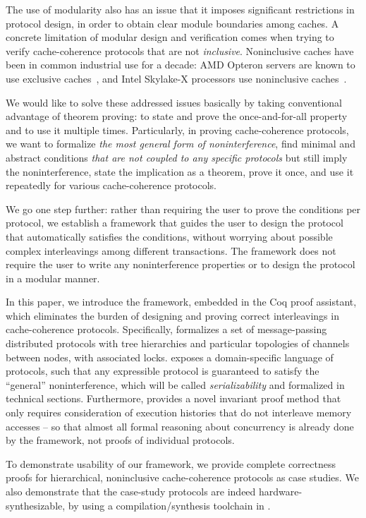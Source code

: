 \documentclass[sigplan,10pt,review,anonymous,screen]{acmart}\settopmatter{printfolios=true,printccs=false,printacmref=false}
\begin{document}
The use of modularity also has an issue that it imposes significant restrictions in protocol design, in order to obtain clear module boundaries among caches.
A concrete limitation of modular design and verification comes when trying to verify cache-coherence protocols that are not \emph{inclusive}.
Noninclusive caches have been in common industrial use for a decade: AMD Opteron servers are known to use exclusive caches~\cite{Irazoqui:2016}, and Intel Skylake-X processors use noninclusive caches~\cite{intel-non-inclusive,Zhao:2010,Yan:2019}.

We would like to solve these addressed issues basically by taking conventional advantage of theorem proving: to state and prove the once-and-for-all property and to use it multiple times.
Particularly, in proving cache-coherence protocols, we want to formalize \emph{the most general form of noninterference}, find minimal and abstract conditions \emph{that are not coupled to any specific protocols} but still imply the noninterference, state the implication as a theorem, prove it once, and use it repeatedly for various cache-coherence protocols.

We go one step further: rather than requiring the user to prove the conditions per protocol, we establish a framework that guides the user to design the protocol that automatically satisfies the conditions, without worrying about possible complex interleavings among different transactions.
The framework does not require the user to write any noninterference properties or to design the protocol in a modular manner.

In this paper, we introduce the \hemiola{} framework, embedded in the Coq proof assistant, which eliminates the burden of designing and proving correct interleavings in cache-coherence protocols.
Specifically, \hemiola{} formalizes a set of message-passing distributed protocols with tree hierarchies and particular topologies of channels between nodes, with associated locks.
\hemiola{} exposes a domain-specific language of protocols, such that any expressible protocol is guaranteed to satisfy the ``general'' noninterference, which will be called \emph{serializability} and formalized in technical sections.
Furthermore, \hemiola{} provides a novel invariant proof method that only requires consideration of execution histories that do not interleave memory accesses -- so that almost all formal reasoning about concurrency is already done by the framework, not proofs of individual protocols.

To demonstrate usability of our framework, we provide complete correctness proofs for hierarchical, noninclusive cache-coherence protocols as case studies.
We also demonstrate that the case-study protocols are indeed hardware-synthesizable, by using a compilation/synthesis toolchain in \hemiola{}.
\end{document}
